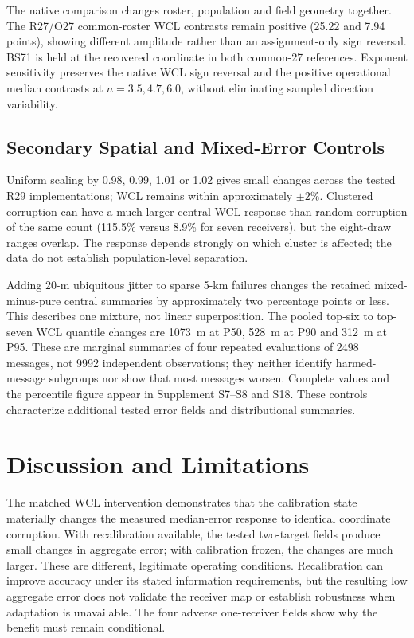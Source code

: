 \documentclass[11pt,a4paper]{article}
\begin{document}
The native comparison changes roster, population and field geometry together. The R27/O27 common-roster WCL contrasts remain positive (25.22 and 7.94 points), showing different amplitude rather than an assignment-only sign reversal. BS71 is held at the recovered coordinate in both common-27 references. Exponent sensitivity preserves the native WCL sign reversal and the positive operational median contrasts at $n=3.5,4.7,6.0$, without eliminating sampled direction variability.

\subsection{Secondary Spatial and Mixed-Error Controls}\label{sec:secondary}
Uniform scaling by 0.98, 0.99, 1.01 or 1.02 gives small changes across the tested R29 implementations; WCL remains within approximately $\pm2\%$. Clustered corruption can have a much larger central WCL response than random corruption of the same count (115.5\% versus 8.9\% for seven receivers), but the eight-draw ranges overlap. The response depends strongly on which cluster is affected; the data do not establish population-level separation.

Adding 20-m ubiquitous jitter to sparse 5-km failures changes the retained mixed-minus-pure central summaries by approximately two percentage points or less. This describes one mixture, not linear superposition. The pooled top-six to top-seven WCL quantile changes are 1073~m at P50, 528~m at P90 and 312~m at P95. These are marginal summaries of four repeated evaluations of 2498 messages, not 9992 independent observations; they neither identify harmed-message subgroups nor show that most messages worsen. Complete values and the percentile figure appear in Supplement S7--S8 and S18. These controls characterize additional tested error fields and distributional summaries.

\section{Discussion and Limitations}\label{sec:discussion}
The matched WCL intervention demonstrates that the calibration state materially changes the measured median-error response to identical coordinate corruption. With recalibration available, the tested two-target fields produce small changes in aggregate error; with calibration frozen, the changes are much larger. These are different, legitimate operating conditions. Recalibration can improve accuracy under its stated information requirements, but the resulting low aggregate error does not validate the receiver map or establish robustness when adaptation is unavailable. The four adverse one-receiver fields show why the benefit must remain conditional.
\end{document}
